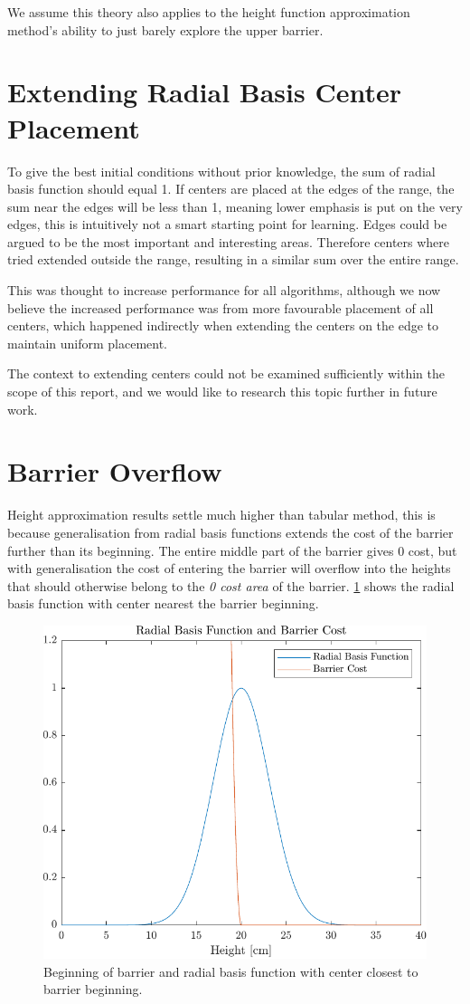 We assume this theory also applies to the height function approximation method's ability to just barely explore the upper barrier. 


\section{Extending Radial Basis Center Placement}
To give the best initial conditions without prior knowledge, the sum of radial basis function should equal 1. If centers are placed at the edges of the range, the sum near the edges will be less than 1, meaning lower emphasis is put on the very edges, this is intuitively not a smart starting point for learning. Edges could be argued to be the most important and interesting areas. Therefore centers where tried extended outside the range, resulting in a similar sum over the entire range. 

This was thought to increase performance for all algorithms, although we now believe the increased performance was from more favourable placement of all centers, which happened indirectly when extending the centers on the edge to maintain uniform placement.

The context to extending centers could not be examined sufficiently within the scope of this report, and we would like to research this topic further in future work.

\newpage

\section{Barrier Overflow}
Height approximation results settle much higher than tabular method, this is because generalisation from radial basis functions extends the cost of the barrier further than its beginning. The entire middle part of the barrier gives 0 cost, but with generalisation the cost of entering the barrier will overflow into the heights that should otherwise belong to the \textit{0 cost area} of the barrier. \cref{fig:RBFandBarrier} shows the radial basis function with center nearest the barrier beginning.

\begin{figure}[h!]
	\centering
	\includegraphics[width=0.7\linewidth]{figures/RBFandBarrier.pdf}
	\caption{Beginning of barrier and radial basis function with center closest to barrier beginning.}
	\label{fig:RBFandBarrier}
\end{figure}


